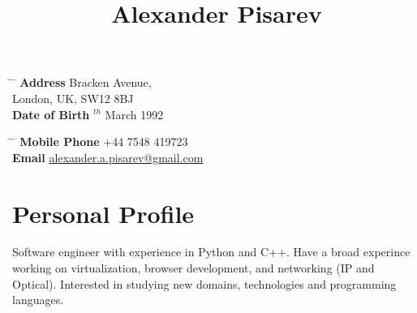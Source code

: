 \documentclass[9pt]{article} %
\begin{document}

\title{Alexander Pisarev} %


\parbox{0.5\textwidth}{ %
\begin{tabbing} %
\hspace{3cm} \= \hspace{4cm} \= \kill %
{\bf Address}  Bracken Avenue,\\ %
\> London, UK, SW12 8BJ \\ %
{\bf Date of Birth} $^{th}$ March 1992 \\ %
\end{tabbing}}
\hfill %
\parbox{0.5\textwidth}{ %
\begin{tabbing} %
\hspace{3cm} \= \hspace{4cm} \= \kill %
{\bf Mobile Phone} \> +44 7548 419723 \\ %
{\bf Email} \> \href{mailto:alexander.a.pisarev@gmail.com}{alexander.a.pisarev@gmail.com} \\ %
\end{tabbing}}
\vspace{-4mm}


\section{Personal Profile}

Software engineer with experience in Python and C++. Have a broad experince working on virtualization, 
browser development, and networking (IP and Optical). Interested in studying new domains, technologies 
and programming languages.

\end{document}

